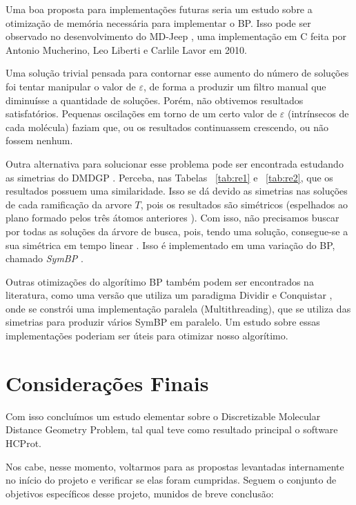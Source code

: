 \documentclass[a4paper,12pt]{article}
\begin{document}
	Uma boa proposta para implementações futuras seria um estudo sobre a otimização de memória necessária para implementar o BP. Isso pode ser observado no desenvolvimento do MD-Jeep \cite{mucherino:BP}, uma implementação em C feita por Antonio Mucherino, Leo Liberti e Carlile Lavor em 2010.
	
	Uma solução trivial pensada para contornar esse aumento do número de soluções foi tentar manipular o valor de $\varepsilon$, de forma a produzir um filtro manual que diminuísse a quantidade de soluções. Porém, não obtivemos resultados satisfatórios. Pequenas oscilações em torno de um certo valor de $\varepsilon$ (intrínsecos de cada molécula) faziam que, ou os resultados continuassem crescendo, ou não fossem nenhum.
	
	Outra alternativa para solucionar esse problema pode ser encontrada estudando as simetrias do DMDGP \cite{fidalgotese} \cite{carlileGDandAplications}. Perceba, nas Tabelas ~\ref{tab:re1} e ~\ref{tab:re2}, que os resultados possuem uma similaridade. Isso se dá devido as simetrias nas soluções de cada ramificação da arvore $T$, pois os resultados são simétricos (espelhados ao plano formado pelos três átomos anteriores \cite{carlileBook31Coloquio}). Com isso, não precisamos buscar por todas as soluções da árvore de busca, pois, tendo uma solução, consegue-se a sua simétrica em tempo linear \cite{fidalgotese}. Isso é implementado em uma variação do BP, chamado \textit{SymBP} \cite{fidalgotese}.
	
	Outras otimizações do algorítimo BP também podem ser encontrados na literatura, como uma versão que utiliza um paradigma Dividir e Conquistar \cite{fidalgotese}, onde se constrói uma implementação paralela (Multithreading), que se utiliza das simetrias para produzir vários SymBP em paralelo. Um estudo sobre essas implementações poderiam ser úteis para otimizar nosso algorítimo.
	
	\newpage
	\section{Considerações Finais}
	Com isso concluímos um estudo elementar sobre o Discretizable Molecular Distance Geometry Problem, tal qual teve como resultado principal o software HCProt. 
	
	Nos cabe, nesse momento, voltarmos para as propostas levantadas internamente no início do projeto e verificar se elas foram cumpridas. Seguem o conjunto de objetivos específicos desse projeto, munidos de breve conclusão:
	
\end{document}

